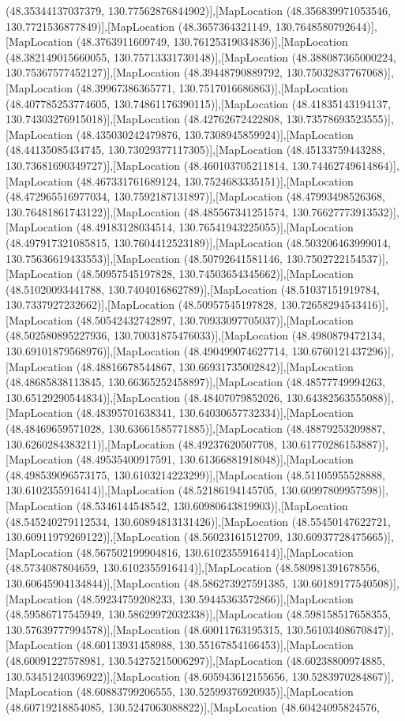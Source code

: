 (48.35344137037379, 130.77562876844902)],[MapLocation (48.356839971053546, 130.7721536877849)],[MapLocation (48.3657364321149, 130.7648580792644)],[MapLocation (48.3763911609749, 130.76125319034836)],[MapLocation (48.382149015660055, 130.75713331730148)],[MapLocation (48.388087365000224, 130.75367577452127)],[MapLocation (48.39448790889792, 130.75032837767068)],[MapLocation (48.39967386365771, 130.7517016686863)],[MapLocation (48.407785253774605, 130.74861176390115)],[MapLocation (48.41835143194137, 130.74303276915018)],[MapLocation (48.42762672422808, 130.73578693523555)],[MapLocation (48.435030242479876, 130.7308945859924)],[MapLocation (48.44135085434745, 130.73029377117305)],[MapLocation (48.45133759443288, 130.73681690349727)],[MapLocation (48.460103705211814, 130.74462749614864)],[MapLocation (48.467331761689124, 130.7524683335151)],[MapLocation (48.472965516977034, 130.7592187131897)],[MapLocation (48.47993498526368, 130.76481861743122)],[MapLocation (48.485567341251574, 130.76627773913532)],[MapLocation (48.49183128034514, 130.76541943225055)],[MapLocation (48.497917321085815, 130.7604412523189)],[MapLocation (48.503206463999014, 130.75636619433553)],[MapLocation (48.50792641581146, 130.7502722154537)],[MapLocation (48.50957545197828, 130.74503654345662)],[MapLocation (48.51020093441788, 130.7404016862789)],[MapLocation (48.51037151919784, 130.7337927232662)],[MapLocation (48.50957545197828, 130.72658294543416)],[MapLocation (48.50542432742897, 130.70933097705037)],[MapLocation (48.502580895227936, 130.70031875476033)],[MapLocation (48.4980879472134, 130.69101879568976)],[MapLocation (48.490499074627714, 130.6760121437296)],[MapLocation (48.48816678544867, 130.66931735002842)],[MapLocation (48.48685838113845, 130.66365252458897)],[MapLocation (48.48577749994263, 130.65129290544834)],[MapLocation (48.48407079852026, 130.64382563555088)],[MapLocation (48.48395701638341, 130.64030657732334)],[MapLocation (48.48469659571028, 130.63661585771885)],[MapLocation (48.48879253209887, 130.6260284383211)],[MapLocation (48.49237620507708, 130.61770286153887)],[MapLocation (48.49535400917591, 130.61366881918048)],[MapLocation (48.498539096573175, 130.6103214223299)],[MapLocation (48.51105955528888, 130.6102355916414)],[MapLocation (48.52186194145705, 130.60997809957598)],[MapLocation (48.5346144548542, 130.60980643819903)],[MapLocation (48.545240279112534, 130.60894813131426)],[MapLocation (48.55450147622721, 130.60911979269122)],[MapLocation (48.56023161512709, 130.60937728475665)],[MapLocation (48.567502199904816, 130.6102355916414)],[MapLocation (48.5734087804659, 130.6102355916414)],[MapLocation (48.580981391678556, 130.60645904134844)],[MapLocation (48.586273927591385, 130.60189177540508)],[MapLocation (48.59234759208233, 130.59445363572866)],[MapLocation (48.59586717545949, 130.58629972032338)],[MapLocation (48.598158517658355, 130.57639777994578)],[MapLocation (48.60011763195315, 130.56103408670847)],[MapLocation (48.60113931458988, 130.55167854166453)],[MapLocation (48.60091227578981, 130.54275215006297)],[MapLocation (48.60238800974885, 130.53451240396922)],[MapLocation (48.605943612155656, 130.5283970284867)],[MapLocation (48.60883799206555, 130.52599376920935)],[MapLocation (48.60719218854085, 130.5247063088822)],[MapLocation (48.60424095824576, 